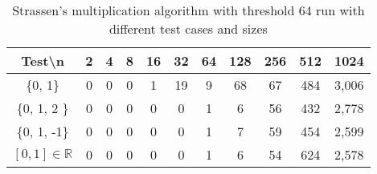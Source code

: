 \documentclass[tikz, 12pt]{scrartcl}
\begin{document}
\begin{table}[h!]
\caption{Strassen's multiplication algorithm with threshold 64 run with different test cases and sizes\label{strassen64}}
\centering
\begin{tabular}{|c|cccccccccc|}
\hline
Test\textbackslash  n		&	2	&	4	&	8	&	16	&	32	&	64	&	128		&	256		&	512		&	1024\\
\hline
\{0, 1\}				&	0	&	0	&	0	&	1	&	19	&	9	&	68		&	67		&	484		&	3,006\\
\{0, 1, 2 \}				&	0	&	0	&	0	&	0	&	0	&	1	&	6		&	56		&	432		&	2,778\\
\{0, 1, -1\}				&	0	&	0	&	0	&	0	&	0	&	1	&	7		&	59		&	454		&	2,599\\
$[0, 1] \in \mathbb{R}$	&	0	&	0	&	0	&	0	&	0	&	1	&	6		&	54		&	624		&	2,578\\
\hline
\end{tabular}
\end{table}
\end{document}
